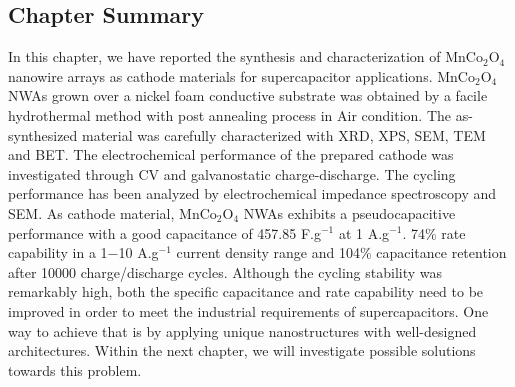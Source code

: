\documentclass[reprint,amsmath,amssymb,aps,floatfix,
]{revtex4-2}
\begin{document}
\subsection{\label{sec:level3}Chapter Summary}
In this chapter, we have reported the synthesis and characterization of MnCo$_2$O$_4$ nanowire arrays as cathode materials for supercapacitor applications. MnCo$_2$O$_4$ NWAs grown over a nickel foam conductive substrate was obtained by a facile hydrothermal method with post annealing process in Air condition. The as-synthesized material was carefully characterized with XRD, XPS, SEM, TEM and BET. The electrochemical performance of the prepared cathode was investigated through CV and galvanostatic charge-discharge. The cycling performance has been analyzed by electrochemical impedance spectroscopy and SEM. As cathode material, MnCo$_2$O$_4$ NWAs exhibits a pseudocapacitive performance with a good capacitance of 457.85 F.g$^{-1}$ at 1 A.g$^{-1}$. 74\% rate capability in a 1$-$10 A.g$^{-1}$ current density range and 104\% capacitance retention after 10000 charge/discharge cycles. Although the cycling stability was remarkably high, both the specific capacitance and rate capability need to be improved in order to meet the industrial requirements of supercapacitors. One way to achieve that is by applying unique nanostructures with well-designed architectures. Within the next chapter, we will investigate possible solutions towards this problem.
\begin{center}
\end{center}
\end{document}
